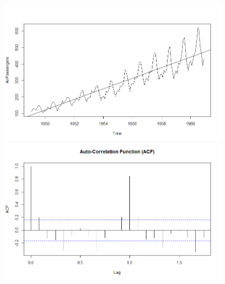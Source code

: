 \begin{figure}[!htb]
  \includegraphics[width=\linewidth]{EtatDeLArt/AR/DataAirPassengers.png}
\endminipage\hfill
{}
  \includegraphics[width=\linewidth]{EtatDeLArt/AR/ACF.png}
\endminipage\hfill


\end{figure}
